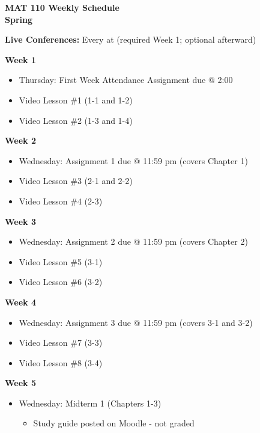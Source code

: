 \documentclass[12pt]{letter}
\author{Jacob Ayers}
\newcommand{\red}[1]{{\color{red}{#1}}} %
\newcommand{\?}{\stackrel{?}{=}}
\begin{document}
	
	\begin{center}
		\textbf{MAT 110 Weekly Schedule \\ Spring \red{Year}}
	\end{center}
	\textbf{Live Conferences:} Every \red{day} at \red{time} (required Week 1; optional afterward)
	
	\textbf{Week 1} \begin{itemize} \vspace{-12pt}
		\item Thursday: First Week Attendance Assignment due @ 2:00
		\item Video Lesson \#1 (1-1 and 1-2)
		\item Video Lesson \#2 (1-3 and 1-4)
	\end{itemize}

	\textbf{Week 2} \begin{itemize} \vspace{-12pt}
		\item Wednesday: Assignment 1 due @ 11:59 pm (covers Chapter 1)
		\item Video Lesson \#3 (2-1 and 2-2)
		\item Video Lesson \#4 (2-3)
	\end{itemize}

	\textbf{Week 3} \begin{itemize} \vspace{-12pt}
		\item Wednesday: Assignment 2 due @ 11:59 pm (covers Chapter 2)
		\item Video Lesson \#5 (3-1)
		\item Video Lesson \#6 (3-2)
	\end{itemize}

	\textbf{Week 4} \begin{itemize} \vspace{-12pt}
		\item Wednesday: Assignment 3 due @ 11:59 pm (covers 3-1 and 3-2)
		\item Video Lesson \#7 (3-3)
		\item Video Lesson \#8 (3-4)
	\end{itemize}

	\textbf{Week 5} \begin{itemize} \vspace{-12pt}
		\item Wednesday: Midterm 1 (Chapters 1-3) \begin{itemize}
			\item Study guide posted on Moodle - not graded
		\end{itemize}
	\end{itemize}
\end{document}
